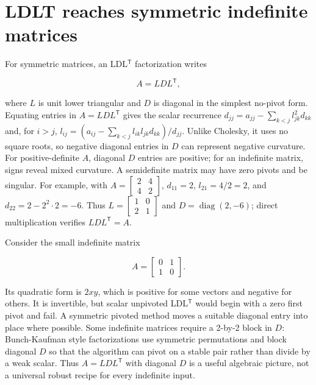 \section{LDLT reaches symmetric indefinite matrices}\label{01-foundations-i-ch020-ldlt-reaches-symmetric-indefinite-matrices}

\hypertarget{01-foundations-i-ch020-ldlt-reaches-symmetric-indefinite-matrices}{}

For symmetric matrices, an LDL\(^\mathsf T\) factorization writes

\[
A=LDL^\mathsf T,
\]

where \(L\) is unit lower triangular and \(D\) is diagonal in the simplest no-pivot form. Equating entries in \(A=LDL^\mathsf T\) gives the scalar recurrence \(d_{jj}=a_{jj}-\sum_{k<j}l_{jk}^2d_{kk}\) and, for \(i>j\), \(l_{ij}=(a_{ij}-\sum_{k<j}l_{ik}l_{jk}d_{kk})/d_{jj}\). Unlike Cholesky, it uses no square roots, so negative diagonal entries in \(D\) can represent negative curvature. For positive-definite \(A\), diagonal \(D\) entries are positive; for an indefinite matrix, signs reveal mixed curvature. A semidefinite matrix may have zero pivots and be singular. For example, with \(A=\begin{bmatrix}2&4\\4&2\end{bmatrix}\), \(d_{11}=2\), \(l_{21}=4/2=2\), and \(d_{22}=2-2^2\cdot2=-6\). Thus \(L=\begin{bmatrix}1&0\\2&1\end{bmatrix}\) and \(D=\operatorname{diag}(2,-6)\); direct multiplication verifies \(LDL^\mathsf T=A\).

Consider the small indefinite matrix

\[
A=\begin{bmatrix}0&1\\1&0\end{bmatrix}.
\]

Its quadratic form is \(2xy\), which is positive for some vectors and negative for others. It is invertible, but scalar unpivoted LDL\(^\mathsf T\) would begin with a zero first pivot and fail. A symmetric pivoted method moves a suitable diagonal entry into place where possible. Some indefinite matrices require a 2-by-2 block in \(D\): Bunch-Kaufman style factorizations use symmetric permutations and block diagonal \(D\) so that the algorithm can pivot on a stable pair rather than divide by a weak scalar. Thus \(A=LDL^\mathsf T\) with diagonal \(D\) is a useful algebraic picture, not a universal robust recipe for every indefinite input.

